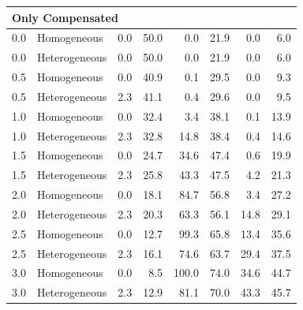 \documentclass[
]{article}
\begin{document}
\begin{table}[H]
\begin{tabular}{r|l|r|r|r|r|r|r}
\hline
\multicolumn{8}{l}{\textbf{Only Compensated}}\\
\hline
\hspace{1em}0.0 & Homogeneous & 0.0 & 50.0 & 0.0 & 21.9 & 0.0 & 6.0\\
\hline
\hspace{1em}0.0 & Heterogeneous & 0.0 & 50.0 & 0.0 & 21.9 & 0.0 & 6.0\\
\hline
\hspace{1em}0.5 & Homogeneous & 0.0 & 40.9 & 0.1 & 29.5 & 0.0 & 9.3\\
\hline
\hspace{1em}0.5 & Heterogeneous & 2.3 & 41.1 & 0.4 & 29.6 & 0.0 & 9.5\\
\hline
\hspace{1em}1.0 & Homogeneous & 0.0 & 32.4 & 3.4 & 38.1 & 0.1 & 13.9\\
\hline
\hspace{1em}1.0 & Heterogeneous & 2.3 & 32.8 & 14.8 & 38.4 & 0.4 & 14.6\\
\hline
\hspace{1em}1.5 & Homogeneous & 0.0 & 24.7 & 34.6 & 47.4 & 0.6 & 19.9\\
\hline
\hspace{1em}1.5 & Heterogeneous & 2.3 & 25.8 & 43.3 & 47.5 & 4.2 & 21.3\\
\hline
\hspace{1em}2.0 & Homogeneous & 0.0 & 18.1 & 84.7 & 56.8 & 3.4 & 27.2\\
\hline
\hspace{1em}2.0 & Heterogeneous & 2.3 & 20.3 & 63.3 & 56.1 & 14.8 & 29.1\\
\hline
\hspace{1em}2.5 & Homogeneous & 0.0 & 12.7 & 99.3 & 65.8 & 13.4 & 35.6\\
\hline
\hspace{1em}2.5 & Heterogeneous & 2.3 & 16.1 & 74.6 & 63.7 & 29.4 & 37.5\\
\hline
\hspace{1em}3.0 & Homogeneous & 0.0 & 8.5 & 100.0 & 74.0 & 34.6 & 44.7\\
\hline
\hspace{1em}3.0 & Heterogeneous & 2.3 & 12.9 & 81.1 & 70.0 & 43.3 & 45.7\\
\hline
\end{tabular}
\end{table}
\end{document}
